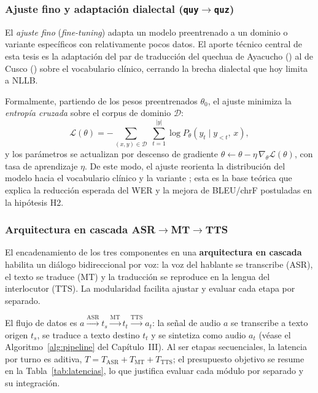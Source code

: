 \subsubsection{Ajuste fino y adaptaci{\'o}n dialectal (\texttt{quy}$\to$\texttt{quz})}
El \emph{ajuste fino} (\emph{fine-tuning}) adapta un modelo preentrenado a un dominio o variante
espec{\'i}ficos con relativamente pocos datos. El aporte t{\'e}cnico central de esta tesis es la
adaptaci{\'o}n del par de traducci{\'o}n del quechua de Ayacucho () al de Cusco
() sobre el vocabulario cl{\'i}nico, cerrando la brecha dialectal que hoy limita a NLLB.

\begin{bloqueNuevo}
\noindent Formalmente, partiendo de los pesos preentrenados $\theta_0$, el ajuste minimiza la
\emph{entrop{\'i}a cruzada} sobre el corpus de dominio $\mathcal{D}$:
\begin{equation}
\mathcal{L}(\theta) = -\!\!\sum_{(x,y)\in\mathcal{D}}\;\sum_{t=1}^{|y|}
\log P_{\theta}\!\left(y_t \mid y_{<t},\, x\right),
\label{eq:perdida}
\end{equation}
y los par{\'a}metros se actualizan por descenso de gradiente
$\theta \leftarrow \theta - \eta\,\nabla_{\theta}\mathcal{L}(\theta)$, con tasa de aprendizaje $\eta$.
De este modo, el ajuste reorienta la distribuci{\'o}n del modelo hacia el vocabulario cl{\'i}nico y la
variante ; esta es la base te{\'o}rica que explica la reducci{\'o}n esperada del WER y la
mejora de BLEU/chrF postuladas en la hip{\'o}tesis H2.
\end{bloqueNuevo}

\subsubsection{Arquitectura en cascada ASR$\to$MT$\to$TTS}
El encadenamiento de los tres componentes en una \textbf{arquitectura en cascada} habilita un
di{\'a}logo bidireccional por voz: la voz del hablante se transcribe (ASR), el texto se traduce (MT)
y la traducci{\'o}n se reproduce en la lengua del interlocutor (TTS). La modularidad facilita ajustar
y evaluar cada etapa por separado.

\begin{bloqueNuevo}
\noindent El flujo de datos es
$a \xrightarrow{\text{ASR}} t_s \xrightarrow{\text{MT}} t_t \xrightarrow{\text{TTS}} a_t$:
la se{\~n}al de audio $a$ se transcribe a texto origen $t_s$, se traduce a texto destino $t_t$ y se
sintetiza como audio $a_t$ (v{\'e}ase el Algoritmo~\ref{alg:pipeline} del Cap{\'i}tulo~III). Al ser
etapas secuenciales, la latencia por turno es aditiva,
$T = T_{\mathrm{ASR}} + T_{\mathrm{MT}} + T_{\mathrm{TTS}}$; el presupuesto objetivo se resume en la
Tabla~\ref{tab:latencias}, lo que justifica evaluar cada m{\'o}dulo por separado y su integraci{\'o}n.
\end{bloqueNuevo}

